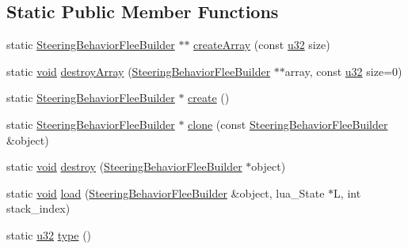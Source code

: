 \subsection*{Static Public Member Functions}
\begin{DoxyCompactItemize}
\item 
static \mbox{\hyperlink{classnjli_1_1_steering_behavior_flee_builder}{Steering\+Behavior\+Flee\+Builder}} $\ast$$\ast$ \mbox{\hyperlink{classnjli_1_1_steering_behavior_flee_builder_a3e15b86e49d246af24205b824649dcf8}{create\+Array}} (const \mbox{\hyperlink{_util_8h_a10e94b422ef0c20dcdec20d31a1f5049}{u32}} size)
\item 
static \mbox{\hyperlink{_thread_8h_af1e856da2e658414cb2456cb6f7ebc66}{void}} \mbox{\hyperlink{classnjli_1_1_steering_behavior_flee_builder_a25155ee100e076c66794a4051bbd16f8}{destroy\+Array}} (\mbox{\hyperlink{classnjli_1_1_steering_behavior_flee_builder}{Steering\+Behavior\+Flee\+Builder}} $\ast$$\ast$array, const \mbox{\hyperlink{_util_8h_a10e94b422ef0c20dcdec20d31a1f5049}{u32}} size=0)
\item 
static \mbox{\hyperlink{classnjli_1_1_steering_behavior_flee_builder}{Steering\+Behavior\+Flee\+Builder}} $\ast$ \mbox{\hyperlink{classnjli_1_1_steering_behavior_flee_builder_ac6cc0482c2b9d77d61468ccaacf665ff}{create}} ()
\item 
static \mbox{\hyperlink{classnjli_1_1_steering_behavior_flee_builder}{Steering\+Behavior\+Flee\+Builder}} $\ast$ \mbox{\hyperlink{classnjli_1_1_steering_behavior_flee_builder_a9f6f2314203a85906d3d0120e210642d}{clone}} (const \mbox{\hyperlink{classnjli_1_1_steering_behavior_flee_builder}{Steering\+Behavior\+Flee\+Builder}} \&object)
\item 
static \mbox{\hyperlink{_thread_8h_af1e856da2e658414cb2456cb6f7ebc66}{void}} \mbox{\hyperlink{classnjli_1_1_steering_behavior_flee_builder_ae60ff44542e4b9b7d664bef80b1f1767}{destroy}} (\mbox{\hyperlink{classnjli_1_1_steering_behavior_flee_builder}{Steering\+Behavior\+Flee\+Builder}} $\ast$object)
\item 
static \mbox{\hyperlink{_thread_8h_af1e856da2e658414cb2456cb6f7ebc66}{void}} \mbox{\hyperlink{classnjli_1_1_steering_behavior_flee_builder_ab8800bc9b2bfd8d9908c535c8476ea59}{load}} (\mbox{\hyperlink{classnjli_1_1_steering_behavior_flee_builder}{Steering\+Behavior\+Flee\+Builder}} \&object, lua\+\_\+\+State $\ast$L, int stack\+\_\+index)
\item 
static \mbox{\hyperlink{_util_8h_a10e94b422ef0c20dcdec20d31a1f5049}{u32}} \mbox{\hyperlink{classnjli_1_1_steering_behavior_flee_builder_a6d1d2f808813c24e3b7c74aeb707adb5}{type}} ()
\end{DoxyCompactItemize}
